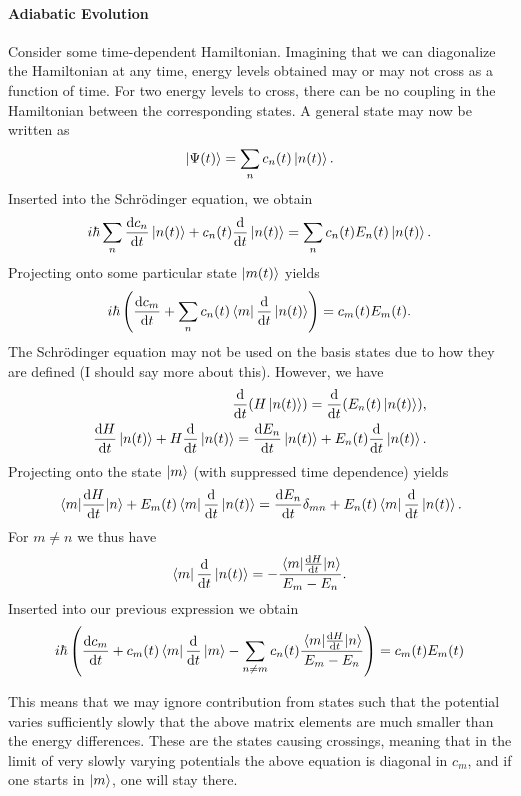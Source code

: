 \paragraph{Adiabatic Evolution}
Consider some time-dependent Hamiltonian. Imagining that we can diagonalize the Hamiltonian at any time, energy levels obtained may or may not cross as a function of time. For two energy levels to cross, there can be no coupling in the Hamiltonian between the corresponding states. A general state may now be written as
\begin{align*}
	\ket{\Psi(t)} = \sum\limits_{n}c_{n}(t)\ket{n(t)}.
\end{align*}
Inserted into the Schrödinger equation, we obtain
\begin{align*}
	i\hbar\sum\limits_{n}\dv{c_{n}}{t}\ket{n(t)} + c_{n}(t)\dv{t}\ket{n(t)} = \sum\limits_{n}c_{n}(t)E_{n}(t)\ket{n(t)}.
\end{align*}
Projecting onto some particular state $\ket{m(t)}$ yields
\begin{align*}
	i\hbar\left(\dv{c_{m}}{t} + \sum\limits_{n}c_{n}(t)\bra{m}\dv{t}\ket{n(t)}\right) = c_{m}(t)E_{m}(t).
\end{align*}
The Schrödinger equation may not be used on the basis states due to how they are defined (I should say more about this). However, we have
\begin{align*}
	\dv{t}(H\ket{n(t)}) = \dv{t}(E_{n}(t)\ket{n(t)}), \\
	\dv{H}{t}\ket{n(t)} + H\dv{t}\ket{n(t)} = \dv{E_{n}}{t}\ket{n(t)} + E_{n}(t)\dv{t}\ket{n(t)}.
\end{align*}
Projecting onto the state $\ket{m}$ (with suppressed time dependence) yields
\begin{align*}
	\mel{m}{\dv{H}{t}}{n} + E_{m}(t)\bra{m}\dv{t}\ket{n(t)} = \dv{E_{n}}{t}\delta_{mn} + E_{n}(t)\bra{m}\dv{t}\ket{n(t)}.
\end{align*}
For $m\neq n$ we thus have
\begin{align*}
	\bra{m}\dv{t}\ket{n(t)} = -\frac{\mel{m}{\dv{H}{t}}{n}}{E_{m} - E_{n}}.
\end{align*}
Inserted into our previous expression we obtain
\begin{align*}
	i\hbar\left(\dv{c_{m}}{t} + c_{m}(t)\bra{m}\dv{t}\ket{m} - \sum\limits_{n \neq m}c_{n}(t)\frac{\mel{m}{\dv{H}{t}}{n}}{E_{m} - E_{n}}\right) = c_{m}(t)E_{m}(t)
\end{align*}

This means that we may ignore contribution from states such that the potential varies sufficiently slowly that the above matrix elements are much smaller than the energy differences. These are the states causing crossings, meaning that in the limit of very slowly varying potentials the above equation is diagonal in $c_{m}$, and if one starts in $\ket{m}$, one will stay there.

